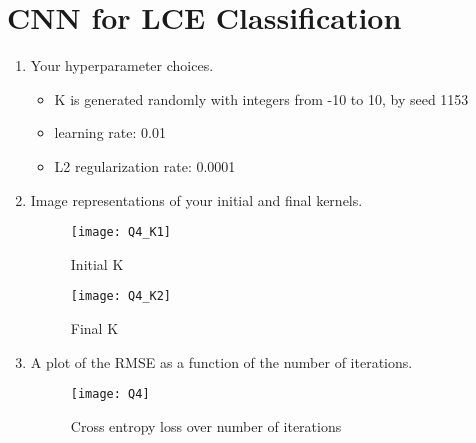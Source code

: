 \documentclass[12pt]{article}
\begin{document}
\section{CNN for LCE Classification}\label{LCE}
\begin{enumerate}
\item Your hyperparameter choices.
\begin{itemize}
\item[]K is generated randomly with integers from -10 to 10, by seed 1153
\item[]learning rate: 0.01
\item[]L2 regularization rate: 0.0001
\end{itemize}

\item Image representations of your initial and final kernels.

\begin{figure}[H]
\centering
\texttt{[image: Q4\_K1]}
\caption{Initial K}
\end{figure} 

\begin{figure}[H]
\centering
\texttt{[image: Q4\_K2]}
\caption{Final K}
\end{figure} 

\item A plot of the RMSE as a function of the number of iterations.
\begin{figure}[H]
\centering
\texttt{[image: Q4]}
\caption{Cross entropy loss over number of iterations}
\end{figure} 


\end{enumerate}

\newpage
\end{document}

